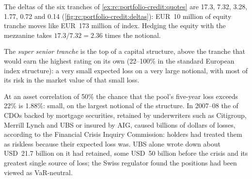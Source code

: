 \begin{example}\label{ex:rc:portfolio-credit:deltas}
The deltas of the six tranches of \cref{ex:rc:portfolio-credit:quotes} are 17.3, 7.32, 3.28,
1.77, 0.72 and 0.14 (\cref{fig:rc:portfolio-credit:deltas}): EUR~10 million of equity
tranche moves like EUR~173 million of index. Hedging the equity with the mezzanine takes
$17.3/7.32 = 2.36$ times the notional.
\end{example}

\begin{omfigure}

\label{fig:rc:portfolio-credit:deltas}
\end{omfigure}

\begin{definition}\label{def:rc:portfolio-credit:ss}
The \emph{super senior tranche} is the top of a capital
structure, above the tranche that would earn the highest rating on its own (22--100\% in
the standard European index structure): a very small expected loss on a very large
notional, with most of its risk in the market value of that small loss.
\end{definition}

\begin{remark}\label{rem:rc:portfolio-credit:ss}
At an asset correlation of 50\% the chance that the pool's five-year loss exceeds 22\% is
1.88\%: small, on the largest notional of the structure. In 2007--08 the  of CDOs backed by mortgage securities, retained by underwriters such as
Citigroup, Merrill Lynch and UBS or insured by AIG, caused billions of dollars of losses,
according to the Financial Crisis Inquiry Commission: holders had treated them as
riskless because their expected loss was. UBS alone wrote down about USD~21.7 billion on  it had retained, some USD~50 billion before the crisis and its greatest single source of
loss; the Swiss regulator found the positions had been viewed as VaR-neutral.
\end{remark}

